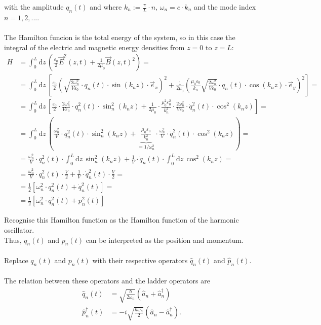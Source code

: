 \documentclass{article}
\newcommand{\diff}{\mathrm{d}}
\newcommand{\lr}[1]{\left(#1\right)}
\newcommand{\lreck}[1]{\left[#1\right]}
\begin{document}
{	with the amplitude $q_n(t)$ and where $k_n := \frac{\pi}{L} \cdot n$, $\omega_n = c \cdot k_n$ and the mode index $n = 1,2,...$.\\
	\\
	The Hamilton funcion is the total energy of the system, so in this case the integral of the electric and magnetic energy densities from $z=0$ to $z=L$:
		\begin{align*}
			H &= \int_0^L \diff z \, \lr{ \frac{\varepsilon_0 }{2} \vec{E}^2(z,t) + \frac{1}{2\mu_0} \vec{B}(z,t)^2 } = \\
			&= \int_0^L \diff z \, \lreck{ \frac{\varepsilon_0}{2} \lr{ \sqrt{ \frac{2\omega_n^2}{V\varepsilon_0} } \cdot q_n(t) \cdot \sin(k_n z) \cdot \vec{e}_x }^2 + \frac{1}{2\mu_0} \lr{ \frac{ \mu_0 \varepsilon_0 }{k_n} \sqrt{ \frac{2\omega_n^2}{V\varepsilon_0} } \cdot \dot{q}_n(t) \cdot \cos(k_n z) \cdot \vec{e}_y }^2 } = \\
			&= \int_0^L \diff z \, \lreck{ \frac{\varepsilon_0}{2} \cdot \frac{2\omega_n^2}{V\varepsilon_0} \cdot q_n^2(t) \cdot \sin_n^2(k_n z) + \frac{1}{2\mu_0} \cdot \frac{\mu_0^2\varepsilon_0^2}{k_n^2} \cdot \frac{2\omega_n^2}{V\varepsilon_0} \cdot \dot{q}_n^2(t) \cdot \cos^2(k_n z) } = \\
			&= \int_0^L \diff z \, \lr{ \frac{\omega_n^2}{V} \cdot q_n^2(t) \cdot \sin_n^2(k_n z) + \underbrace{ \frac{\mu_0\varepsilon_0}{k_n^2} }_{= 1 / \omega_n^2}\cdot \frac{\omega_n^2}{V} \cdot \dot{q}^2_n(t) \cdot \cos^2(k_n z) } = \\
			&= \frac{\omega_n^2}{V} \cdot q_n^2(t) \cdot \int_0^L \diff z \, \sin_n^2(k_n z) + \frac{1}{V} \cdot \dot{q}_n(t) \cdot \int_0^L \diff z \, \cos^2(k_n z) = \\
			&= \frac{\omega_n^2}{V} \cdot q_n^2(t) \cdot \frac{V}{2} + \frac{1}{V} \cdot \dot{q}^2_n(t) \cdot \frac{V}{2} = \\
			&= \frac{1}{2} \lreck{ \omega_n^2 \cdot q_n^2(t) + \dot{q}^2_n(t) } = \\
			&= \frac{1}{2} \lreck{ \omega_n^2 \cdot q_n^2(t) + p_n^2(t) }
		\end{align*}

	Recognise this Hamilton function as the Hamilton function of the harmonic oscillator.\\
	Thus, $q_n(t)$ and $p_n(t)$ can be interpreted as the position and momentum.\\
	\\
	Replace $q_n(t)$ and $p_n(t)$ with their respective operators $\hat{q}_n(t)$ and $\hat{p}_n(t)$.\\
	\\
	The relation between these operators and the ladder operators are
		\begin{align*}
			\hat{q}_n(t) &= \sqrt{ \frac{\hbar}{2\omega_n} } \lr{ \hat{a}_n + \hat{a}^\dagger_n } \\
			\hat{p}^\dagger_n(t) &= -i\sqrt{ \frac{\hbar\omega_n}{2} } \lr{ \hat{a}_n - \hat{a}^\dagger_n }.
		\end{align*}

}
\end{document}
